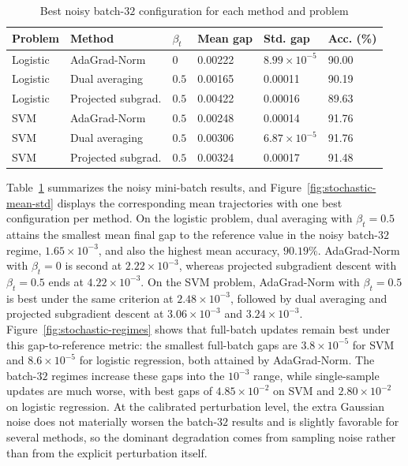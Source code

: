 \documentclass[11pt]{article}
\theoremstyle{definition}
\theoremstyle{remark}
\begin{document}
\begin{table}[H]
    \centering
    \caption{Best noisy batch-$32$ configuration for each method and problem}
    \label{tab:stochastic-noisy}
    \small
    \begin{tabular}{llllll}
        \toprule
        Problem & Method & $\beta_t$ & Mean gap & Std. gap & Acc. (\%) \\
        \midrule
        Logistic & AdaGrad-Norm & $0$ & 0.00222 & $8.99\times 10^{-5}$ & 90.00 \\
        Logistic & Dual averaging & $0.5$ & 0.00165 & 0.00011 & 90.19 \\
        Logistic & Projected subgrad. & $0.5$ & 0.00422 & 0.00016 & 89.63 \\
        SVM & AdaGrad-Norm & $0.5$ & 0.00248 & 0.00014 & 91.76 \\
        SVM & Dual averaging & $0.5$ & 0.00306 & $6.87\times 10^{-5}$ & 91.76 \\
        SVM & Projected subgrad. & $0.5$ & 0.00324 & 0.00017 & 91.48 \\
        \bottomrule
    \end{tabular}
\end{table}

Table~\ref{tab:stochastic-noisy} summarizes the noisy mini-batch results, and Figure~\ref{fig:stochastic-mean-std} displays the corresponding mean trajectories with one best configuration per method. On the logistic problem, dual averaging with $\beta_t=0.5$ attains the smallest mean final gap to the reference value in the noisy batch-$32$ regime, $1.65\times 10^{-3}$, and also the highest mean accuracy, $90.19\%$. AdaGrad-Norm with $\beta_t=0$ is second at $2.22\times 10^{-3}$, whereas projected subgradient descent with $\beta_t=0.5$ ends at $4.22\times 10^{-3}$. On the SVM problem, AdaGrad-Norm with $\beta_t=0.5$ is best under the same criterion at $2.48\times 10^{-3}$, followed by dual averaging and projected subgradient descent at $3.06\times 10^{-3}$ and $3.24\times 10^{-3}$. Figure~\ref{fig:stochastic-regimes} shows that full-batch updates remain best under this gap-to-reference metric: the smallest full-batch gaps are $3.8\times 10^{-5}$ for SVM and $8.6\times 10^{-5}$ for logistic regression, both attained by AdaGrad-Norm. The batch-$32$ regimes increase these gaps into the $10^{-3}$ range, while single-sample updates are much worse, with best gaps of $4.85\times 10^{-2}$ on SVM and $2.80\times 10^{-2}$ on logistic regression. At the calibrated perturbation level, the extra Gaussian noise does not materially worsen the batch-$32$ results and is slightly favorable for several methods, so the dominant degradation comes from sampling noise rather than from the explicit perturbation itself.
\end{document}
